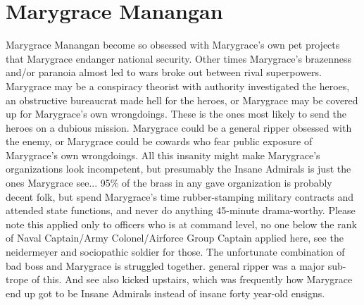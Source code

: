 \documentclass[12pt]{book}
\begin{document}
\chapter{Marygrace Manangan}

Marygrace Manangan become so obsessed with Marygrace's own pet projects that Marygrace endanger national security. Other times Marygrace's brazenness and/or paranoia almost led to wars broke out between rival superpowers. Marygrace may be a conspiracy theorist with authority investigated the heroes, an obstructive bureaucrat made hell for the heroes, or Marygrace may be covered up for Marygrace's own wrongdoings. These is the ones most likely to send the heroes on a dubious mission. Marygrace could be a general ripper obsessed with the enemy, or Marygrace could be cowards who fear public exposure of Marygrace's own wrongdoings. All this insanity might make Marygrace's organizations look incompetent, but presumably the Insane Admirals is just the ones Marygrace see... 95\% of the brass in any gave organization is probably decent folk, but spend Marygrace's time rubber-stamping military contracts and attended state functions, and never do anything 45-minute drama-worthy. Please note this applied only to officers who is at command level, no one below the rank of Naval Captain/Army Colonel/Airforce Group Captain applied here, see the neidermeyer and sociopathic soldier for those. The unfortunate combination of bad boss and Marygrace is struggled together. general ripper was a major sub-trope of this. And see also kicked upstairs, which was frequently how Marygrace end up got to be Insane Admirals instead of insane forty year-old ensigns.
\end{document}
